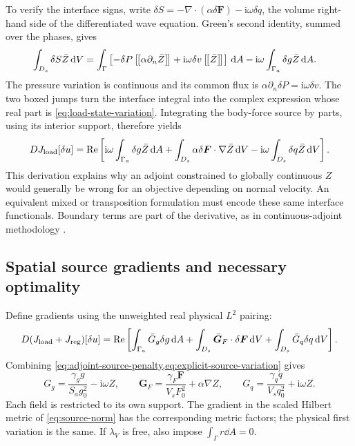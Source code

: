 To verify the interface signs, write $\delta S=-\nabla\cdot
(\alpha\delta\bm F)-\mathrm i\omega\delta q$, the volume right-hand side
of the differentiated wave equation. Green's second identity, summed over
the phases, gives
\begin{align}
 \int_{D_s}\delta S\bar Z\,\mathrm d V
   &=\int_\Gamma\left[-\delta P\left[\!\left[\alpha\partial_n\bar Z\right]\!\right]
                      +\mathrm i\omega\delta v\left[\!\left[\bar Z\right]\!\right]\right]\,\mathrm d A
         -\mathrm i\omega\int_{\Gamma_a}\delta g\bar Z\,\mathrm d A.
 \label{eq:source-green-identity}
\end{align}
The pressure variation is continuous and its common flux is
$\alpha\partial_n\delta P=\mathrm i\omega\delta v$.
The two boxed jumps turn the interface integral into the complex expression
whose real part is \cref{eq:load-state-variation}. Integrating the body-force
source by parts, using its interior support, therefore yields
\begin{equation}
 DJ_{\rm load}[\delta u]=\operatorname{Re}\left[
  \mathrm i\omega\int_{\Gamma_a}\delta g\bar Z\,\mathrm d A
  +\int_{D_s}\alpha\delta\bm F\cdot\nabla\bar Z\,\mathrm d V
  -\mathrm i\omega\int_{D_s}\delta q\bar Z\,\mathrm d V\right].
 \label{eq:explicit-source-variation}
\end{equation}
This derivation explains why an adjoint constrained to globally continuous
$Z$ would generally be wrong for an objective depending on normal velocity.
An equivalent mixed or transposition formulation must encode these same
interface functionals. Boundary terms are part of the derivative, as in
continuous-adjoint methodology \cite{giles2000}.

\subsection{Spatial source gradients and necessary optimality}
Define gradients using the unweighted real physical $L^2$ pairing:
\begin{equation}
 D(J_{\rm load}+J_{\rm reg})[\delta u]
  =\operatorname{Re}\left[\int_{\Gamma_a}\bar G_g\delta g\,\mathrm d A
        +\int_{D_s}\bar{\bm G}_F\cdot\delta\bm F\,\mathrm d V
        +\int_{D_s}\bar G_q\delta q\,\mathrm d V\right].
 \label{eq:physical-gradient-pairing}
\end{equation}
Combining \cref{eq:adjoint-source-penalty,eq:explicit-source-variation} gives
\begin{equation}
 \boxed{G_g=\frac{\gamma_g g}{S_ag_0^2}-\mathrm i\omega Z,\qquad
 \bm G_F=\frac{\gamma_F\bm F}{V_sF_0^2}+\alpha\nabla Z,\qquad
 G_q=\frac{\gamma_q q}{V_sq_0^2}+\mathrm i\omega Z.}
 \label{eq:distributed-gradients}
\end{equation}
Each field is restricted to its own support. The gradient in the scaled
Hilbert metric of \cref{eq:source-norm} has the corresponding metric factors;
the physical first variation is the same. If $\lambda_V$ is free, also impose
$\int_\Gamma r\dd A=0$.


